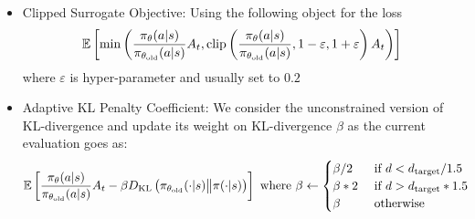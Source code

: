 \begin{itemize}
    \item Clipped Surrogate Objective: Using the following object for the loss
    \begin{equation}
        \mathbb{E}\left[ \min\left( \frac{\pi_\theta(a | s)}{\pi_{\theta_{\text{old}}}(a | s)} A_t, \operatorname{clip}\left( \frac{\pi_\theta(a | s)}{\pi_{\theta_{\text{old}}}(a | s)}, 1-\varepsilon, 1+\varepsilon \right) A_t \right) \right]
    \end{equation}
    where $\varepsilon$ is hyper-parameter and usually set to $0.2$
    \item  Adaptive KL Penalty Coefficient: We consider the unconstrained version of KL-divergence and update its weight on KL-divergence $\beta$ as the current evaluation goes as:
    \begin{equation}
        \begin{aligned}
            &\mathbb{E}\left[ \frac{\pi_\theta(a | s)}{\pi_{\theta_{\text{old}}}(a | s)} A_t - \beta D_{\mathrm{KL}}\left(  \pi_{\theta_\text{old}}(\cdot | s) \big\| \pi(\cdot | s) \right) \right] \text{ where } \beta \leftarrow \begin{cases}
                \beta/2 &\text{ if } d < d_{\operatorname{target}}/1.5 \\
                \beta * 2 &\text{ if } d > d_{\operatorname{target}} * 1.5 \\
                \beta &\text{ otherwise }
            \end{cases}
        \end{aligned}
    \end{equation}
\end{itemize}

